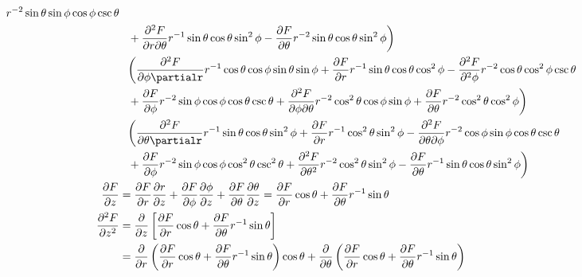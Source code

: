 \documentclass[12pt]{article}
\begin{document}
\begin{gather*}
\begin{aligned}
					r^{-2}\sin\theta\sin\phi\cos\phi\csc\theta \\
				&\phantom{=} + \frac{\partial^2 F} {\partial r\partial \theta}
					r^{-1}\sin\theta\cos\theta\sin^2\phi
				- \frac{\partial F} {\partial \theta}
					r^{-2}\sin\theta\cos\theta\sin^2\phi
			\biggl) \\
		&\phantom{=} 
			\biggl( 
				\frac{\partial^2 F} {\partial\phi\partialr}
					r^{-1}\cos\theta\cos\phi\sin\theta\sin\phi
				+ \frac{\partial F} {\partial r} r^{-1}\sin\theta\cos\theta\cos^2\phi
				- \frac{\partial^2 F} {\partial^2 \phi}
					r^{-2}\cos\theta\cos^2\phi\csc\theta \\
				&\phantom{=} + \frac{\partial F} {\partial \phi}
					r^{-2}\sin\phi\cos\phi\cos\theta\csc\theta 
				+ \frac{\partial^2 F} {\partial\phi\partial\theta}
					r^{-2}\cos^2\theta\cos\phi\sin\phi
				+ \frac{\partial F} {\partial \theta} r^{-2}\cos^2\theta\cos^2\phi
			\biggl) \\
		&\phantom{=}
			\biggl( 
				\frac{\partial^2 F} {\partial\theta\partialr}
					r^{-1}\sin\theta\cos\theta\sin^2\phi
				+\frac{\partial F} {\partial r} r^{-1}\cos^2\theta\sin^2\phi
				- \frac{\partial^2 F} {\partial\theta\partial\phi}
					r^{-2}\cos\phi\sin\phi\cos\theta\csc\theta \\
				&\phantom{=} + \frac{\partial F} {\partial \phi}
					r^{-2}\sin\phi\cos\phi\cos^2\theta\csc^2\theta 
				+ \frac{\partial^2 F} {\partial\theta^2} r^{-2}\cos^2\theta\sin^2\phi
				- \frac{\partial F} {\partial \theta}
					r^{-1}\sin\theta\cos\theta\sin^2\phi
			\biggl) \\
		\frac{\partial F}{\partial z} 
			&= \frac{\partial F} {\partial r} \frac{\partial r}{\partial z}
			+ \frac{\partial F} {\partial \phi} \frac{\partial \phi}{\partial z}
			+ \frac{\partial F} {\partial \theta} \frac{\partial \theta}{\partial z} 
			= \frac{\partial F} {\partial r} \cos\theta
			+ \frac{\partial F} {\partial \theta} r^{-1}\sin\theta \\
		\frac{\partial^2 F}{\partial z^2} 
			&=\frac{\partial}{\partial z} \left[ 
				\frac{\partial F} {\partial r} \cos\theta
				+ \frac{\partial F} {\partial \theta} r^{-1}\sin\theta
			\right] \\
		&= \frac{\partial}{\partial r} 
			\left( 
				\frac{\partial F} {\partial r} \cos\theta
				+ \frac{\partial F} {\partial \theta} r^{-1}\sin\theta
			\right) \cos\theta 
			+\frac{\partial}{\partial \theta}
			\left( 
				\frac{\partial F} {\partial r} \cos\theta
				+ \frac{\partial F} {\partial \theta} r^{-1}\sin\theta
			\right) 

\end{aligned}
\end{gather*}
\end{document}
